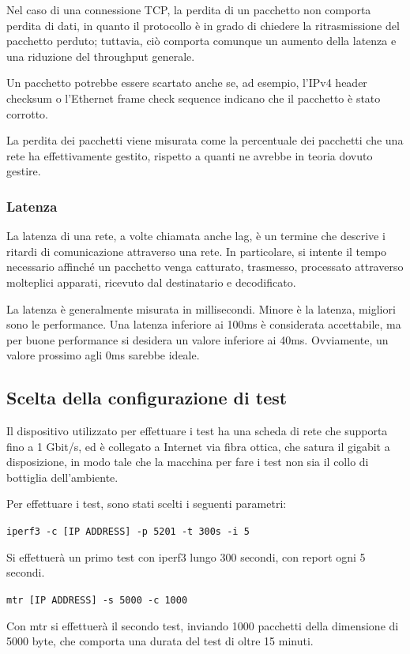 Nel caso di una connessione TCP, la perdita di un pacchetto non comporta perdita di dati, in quanto il protocollo è in grado di chiedere la ritrasmissione del pacchetto perduto; tuttavia, ciò comporta comunque un aumento della latenza e una riduzione del throughput generale.

Un pacchetto potrebbe essere scartato anche se, ad esempio, l'IPv4 header checksum o l'Ethernet frame check sequence indicano che il pacchetto è stato corrotto.

La perdita dei pacchetti viene misurata come la percentuale dei pacchetti che una rete ha effettivamente gestito, rispetto a quanti ne avrebbe in teoria dovuto gestire.


\subsubsection{Latenza}
La latenza di una rete, a volte chiamata anche lag, è un termine che descrive i ritardi di comunicazione attraverso una rete. In particolare, si intente il tempo necessario affinché un pacchetto venga catturato, trasmesso, processato attraverso molteplici apparati, ricevuto dal destinatario e decodificato.

La latenza è generalmente misurata in millisecondi. Minore è la latenza, migliori sono le performance. Una latenza inferiore ai 100ms è considerata accettabile, ma per buone performance si desidera un valore inferiore ai 40ms. Ovviamente, un valore prossimo agli 0ms sarebbe ideale.

\subsection{Scelta della configurazione di test}
Il dispositivo utilizzato per effettuare i test ha una scheda di rete che supporta fino a  1 Gbit/s, ed è collegato a Internet via fibra ottica, che satura il gigabit a disposizione, in modo tale che la macchina per fare i test non sia il collo di bottiglia dell'ambiente.


Per effettuare i test, sono stati scelti i seguenti parametri:


\texttt{iperf3 -c [IP ADDRESS] -p 5201 -t 300s -i 5}


Si effettuerà un primo test con iperf3 lungo 300 secondi, con report ogni 5 secondi.

\texttt{mtr [IP ADDRESS] -s 5000 -c 1000}


Con mtr si effettuerà il secondo test, inviando 1000 pacchetti della dimensione di 5000 byte, che comporta una durata del test di oltre 15 minuti.

